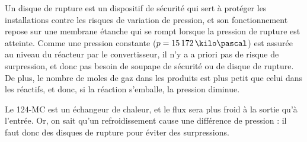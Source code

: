 Un disque de rupture est un dispositif de sécurité qui sert à protéger les installations contre les risques de variation de pression, et son fonctionnement repose sur une membrane étanche qui se rompt lorsque la pression de rupture est atteinte. \cite{disque}
Comme une pression constante ($p=15\,172\,\kilo\pascal$) est assurée au niveau du réacteur par le convertisseur, il n'y a a priori pas de risque de surpression, et donc pas besoin de soupape de sécurité ou de disque de rupture.
De plus, le nombre de moles de gaz dans les produits est plus petit que celui dans les réactifs, et donc, si la réaction s'emballe, la pression diminue.

Le 124-MC est un échangeur de chaleur, et le flux sera plus froid à la sortie qu'à l'entrée.
Or, on sait qu'un refroidissement cause une différence de pression : il faut donc des disques de rupture pour éviter des surpressions.
